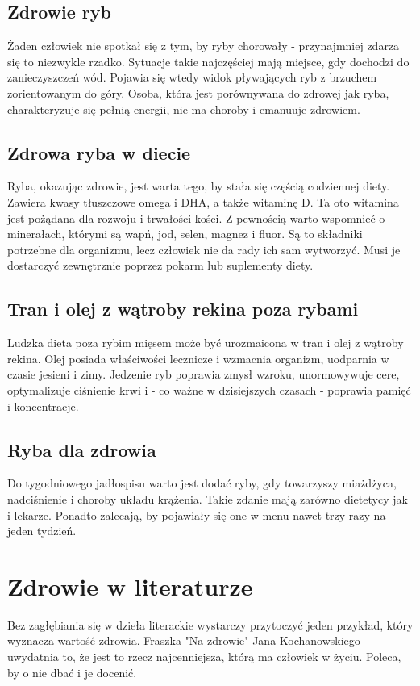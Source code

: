 \documentclass[11pt,a4paper]{article}
\begin{document}
\subsection{Zdrowie ryb}
Żaden człowiek nie spotkał się z tym, by ryby chorowały - przynajmniej zdarza się to niezwykle rzadko. Sytuacje takie najczęściej mają miejsce, gdy dochodzi do zanieczyszczeń wód. Pojawia się wtedy widok pływających ryb z brzuchem zorientowanym do góry. Osoba, która jest porównywana do zdrowej jak ryba, charakteryzuje się pełnią energii, nie ma choroby i emanuuje zdrowiem.

\subsection{Zdrowa ryba w diecie}
Ryba, okazując zdrowie, jest warta tego, by stała się częścią codziennej diety. Zawiera kwasy tłuszczowe omega i DHA, a także witaminę D. Ta oto witamina jest pożądana dla rozwoju i trwałości kości. Z pewnością warto wspomnieć o minerałach, którymi są wapń, jod, selen, magnez i fluor. Są to składniki potrzebne dla organizmu, lecz człowiek nie da rady ich sam wytworzyć. Musi je dostarczyć zewnętrznie poprzez pokarm lub suplementy diety.

\subsection{Tran i olej z wątroby rekina poza rybami}
Ludzka dieta poza rybim mięsem może być urozmaicona w tran i olej z wątroby rekina. Olej posiada właściwości lecznicze i wzmacnia organizm, uodparnia w czasie jesieni i zimy. Jedzenie ryb poprawia zmysł wzroku, unormowywuje cere, optymalizuje ciśnienie krwi i - co ważne w dzisiejszych czasach - poprawia pamięć i koncentracje.

\subsection{Ryba dla zdrowia}
Do tygodniowego jadłospisu warto jest dodać ryby, gdy towarzyszy miażdżyca, nadciśnienie i choroby układu krążenia. Takie zdanie mają zarówno dietetycy jak i lekarze. Ponadto zalecają, by pojawiały się one w menu nawet trzy razy na jeden tydzień.

\section{Zdrowie w literaturze}
Bez zagłębiania się w dzieła literackie wystarczy przytoczyć jeden przykład, który wyznacza wartość zdrowia. Fraszka "Na zdrowie" Jana Kochanowskiego uwydatnia to, że jest to rzecz najcenniejsza, którą ma człowiek w życiu. Poleca, by o nie dbać i je docenić.
\end{document}
